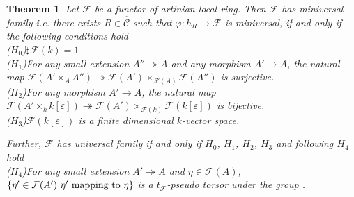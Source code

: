 \documentclass{ctexart}
\newtheorem{theorem}{Theorem}[section]
\begin{document}
\begin{theorem}
    Let $\mathcal{F}$ be a functor of artinian local ring.
    Then $\mathcal{F}$ has miniversal family i.e. there exists $R\in \widehat{\mathcal{C}}$ such that $\varphi: h_{R} \rightarrow \mathcal{F}$ is miniversal,
    if and only if the following conditions hold \\
    ($H_{0}$)$\sharp \mathcal{F}(k) = 1$ \\
    ($H_{1}$)For any small extension $A'' \twoheadrightarrow A$ and any morphism $A' \rightarrow A$, 
    the natural map $\mathcal{F}(A' \times_{A} A'') \twoheadrightarrow \mathcal{F}(A') \times_{\mathcal{F}(A)} \mathcal{F}(A'')$ is surjective. \\
    ($H_{2}$)For any morphism $A' \rightarrow A$,
    the natural map $\mathcal{F}(A' \times_{k} k[\varepsilon]) \twoheadrightarrow \mathcal{F}(A') \times_{\mathcal{F}(k)} \mathcal{F}(k[\varepsilon])$ is bijective. \\
    ($H_{3}$)$\mathcal{F}(k[\varepsilon])$ is a finite dimensional $k$-vector space.
    \par
    Further, $\mathcal{F}$ has universal family if and only if $H_{0}$, $H_{1}$, $H_{2}$, $H_{3}$ and following $H_{4}$ hold \\
    ($H_{4}$)For any small extension $A' \twoheadrightarrow A$ and $\eta\in \mathcal{F}(A)$,
    $\{\eta'\in \mathcal{F}(A') \big{|} \eta' \text{ mapping to } \eta\}$ is a $t_{\mathcal{F}}$-pseudo torsor under the group .
    \label{Theorem 4.1} 
\end{theorem}
\end{document}
